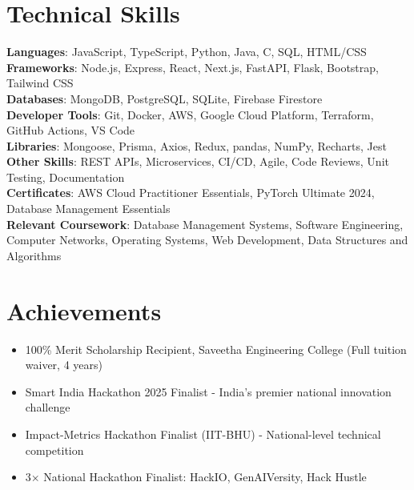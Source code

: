 \documentclass[letterpaper,11pt]{article}
\newcommand{\resumeItem}[1]{
  \item\small{
    {#1 \vspace{-2pt}}
  }
}
\newcommand{\resumeItemListStart}{\begin{itemize}}
\newcommand{\resumeItemListEnd}{\end{itemize}\vspace{-5pt}}
\begin{document}
\section{Technical Skills}
\begin{itemize}[leftmargin=0.15in, label={}]
  \small{\item{
    \textbf{Languages}{: JavaScript, TypeScript, Python, Java, C, SQL, HTML/CSS} \\
    \textbf{Frameworks}{: Node.js, Express, React, Next.js, FastAPI, Flask, Bootstrap, Tailwind CSS} \\
    \textbf{Databases}{: MongoDB, PostgreSQL, SQLite, Firebase Firestore} \\
    \textbf{Developer Tools}{: Git, Docker, AWS, Google Cloud Platform, Terraform, GitHub Actions, VS Code} \\
    \textbf{Libraries}{: Mongoose, Prisma, Axios, Redux, pandas, NumPy, Recharts, Jest} \\
    \textbf{Other Skills}{: REST APIs, Microservices, CI/CD, Agile, Code Reviews, Unit Testing, Documentation} \\
    \textbf{Certificates}{: AWS Cloud Practitioner Essentials, PyTorch Ultimate 2024, Database Management Essentials} \\
    \textbf{Relevant Coursework}{: Database Management Systems, Software Engineering, Computer Networks, Operating Systems, Web Development, Data Structures and Algorithms}
  }}
\end{itemize}

\section{Achievements}
\resumeItemListStart
  \resumeItem{100\% Merit Scholarship Recipient, Saveetha Engineering College (Full tuition waiver, 4 years)}
  \resumeItem{Smart India Hackathon 2025 Finalist - India's premier national innovation challenge}
  \resumeItem{Impact-Metrics Hackathon Finalist (IIT-BHU) - National-level technical competition}
  \resumeItem{3$\times$ National Hackathon Finalist: HackIO, GenAIVersity, Hack Hustle}
\resumeItemListEnd
\end{document}
